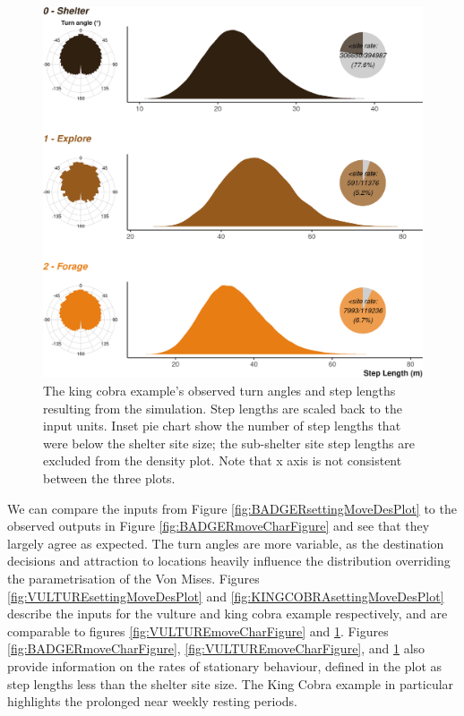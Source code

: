 \documentclass[10pt,a4paper]{article}
\begin{document}
\begin{figure}

{\centering \includegraphics{Agent-based_model_walkthrough_files/figure-latex/KINGCOBRAmoveCharFigure-1} 

}

\caption{The king cobra example's observed turn angles and step lengths resulting from the simulation. Step lengths are scaled back to the input units. Inset pie chart show the number of step lengths that were below the shelter site size; the sub-shelter site step lengths are excluded from the density plot. Note that x axis is not consistent between the three plots.}\label{fig:KINGCOBRAmoveCharFigure}
\end{figure}

We can compare the inputs from Figure \ref{fig:BADGERsettingMoveDesPlot} to the observed outputs in Figure \ref{fig:BADGERmoveCharFigure} and see that they largely agree as expected.
The turn angles are more variable, as the destination decisions and attraction to locations heavily influence the distribution overriding the parametrisation of the Von Mises.
Figures \ref{fig:VULTUREsettingMoveDesPlot} and \ref{fig:KINGCOBRAsettingMoveDesPlot} describe the inputs for the vulture and king cobra example respectively, and are comparable to figures \ref{fig:VULTUREmoveCharFigure} and \ref{fig:KINGCOBRAmoveCharFigure}.
Figures \ref{fig:BADGERmoveCharFigure}, \ref{fig:VULTUREmoveCharFigure}, and \ref{fig:KINGCOBRAmoveCharFigure} also provide information on the rates of stationary behaviour, defined in the plot as step lengths less than the shelter site size.
The King Cobra example in particular highlights the prolonged near weekly resting periods.
\end{document}
